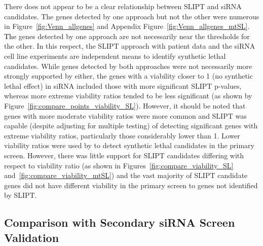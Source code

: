 There does not appear to be a clear relationship between \gls{SLIPT} and \gls{siRNA} candidates. The genes detected by one approach but not the other were numerous in Figure~\ref{fig:Venn_allgenes} and Appendix Figure~\ref{fig:Venn_allgenes_mtSL}. \textcolor{black}{The} genes detected by one approach are not necessarily near the thresholds for the other. In this respect, the \gls{SLIPT} approach with patient data and the \gls{siRNA} cell line experiments are independent means to identify \gls{synthetic lethal} candidates. While genes detected by both approaches were not necessarily more strongly supported by either, the genes with a viability closer to 1 (no \gls{synthetic lethal} effect) in \gls{siRNA} included those with more significant \gls{SLIPT} p-values, whereas more extreme viability ratios tended to be less significant (as shown by Figure~\ref{fig:compare_points_viability_SL}). However, it should be noted that genes with more moderate viability ratios were more common and \gls{SLIPT} was capable (despite adjusting for multiple testing) of detecting significant genes with extreme viability ratios, particularly those considerably lower than 1. 
%
Lower viability ratios were used by \citet{Telford2015} to detect \gls{synthetic lethal} candidates in the primary screen. However, there was little support for \gls{SLIPT} candidates differing with respect to viability ratio (as shown in Figures~\ref{fig:compare_viability_SL} and~\ref{fig:compare_viability_mtSL}) %
and the vast majority of \gls{SLIPT} candidate genes did not have different viability in the primary screen to genes not identified by \gls{SLIPT}.


\FloatBarrier

\subsection{Comparison with Secondary siRNA Screen Validation} 
\label{chapt3:secondary_screen}

